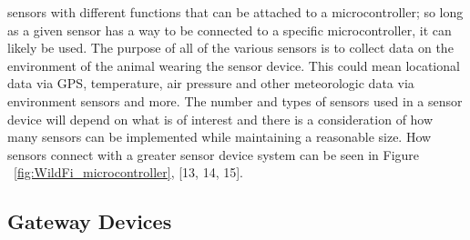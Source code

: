 \documentclass[sigplan,screen,nonacm]{acmart}
\begin{document}
sensors with different functions that can be attached to a microcontroller; so long as a given sensor has a way to be 
connected to a specific microcontroller, it can likely be used. The purpose of all of the various sensors is 
to collect data on the environment of the animal wearing the sensor device. This could mean locational data via GPS,   
temperature, air pressure and other meteorologic data via environment sensors and more. The number and types of sensors 
used in a sensor device will depend on what is of interest and there is a consideration of how many sensors can be 
implemented while maintaining a reasonable size. How sensors connect with a greater sensor device system can 
be seen in Figure ~\ref{fig:WildFi_microcontroller}, [13, 14, 15].

\subsection{Gateway Devices}
\label{subsec:Gateway Devices}
\end{document}
